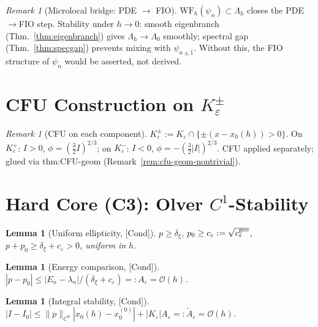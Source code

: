 \documentclass[12pt,a4paper]{amsart}
\newtheorem{lemma}[theorem]{Lemma}
\theoremstyle{definition}
\theoremstyle{remark}
\newtheorem{remark}[theorem]{Remark}
\newcommand{\Cond}{\textup{[Cond]}}
\begin{document}
\begin{remark}[Microlocal bridge: PDE $\to$ FIO]
\label{rem:micro-bridge}
$\mathrm{WF}_h(\psi_n)\subset\Lambda_h$ closes the PDE$\to$FIO step.
Stability under $h\to 0$: smooth eigenbranch (Thm.~\ref{thm:eigenbranch})
gives $\Lambda_h\to\Lambda_0$ smoothly;
spectral gap (Thm.~\ref{thm:specgap}) prevents mixing with $\psi_{n\pm 1}$.
Without this, the FIO structure of $\psi_n$ would be asserted, not derived.
\end{remark}

\section{CFU Construction on $K_\varepsilon^\pm$}
\label{sec:cfu-components}

\begin{remark}[CFU on each component]
\label{rem:cfu-components}
$K_\varepsilon^\pm:=K_\varepsilon\cap\{\pm(x-x_0(h))>0\}$.
On $K_\varepsilon^+$: $I>0$, $\phi=(\tfrac32 I)^{2/3}$;
on $K_\varepsilon^-$: $I<0$, $\phi=-(\tfrac32|I|)^{2/3}$.
CFU \cite{CFU1957} applied separately;
glued via thm:CFU-geom (Remark~\ref{rem:cfu-geom-nontrivial}).
\end{remark}

\section{Hard Core (C3): Olver $C^1$-Stability}
\label{sec:olver-C1}

\begin{lemma}[Uniform ellipticity, \Cond]
\label{lem:uniform-ellipticity}
$p\ge\delta_\xi$, $p_0\ge c_\varepsilon:=\sqrt{c_\varepsilon^{\rm geo}}$,
$p+p_0\ge\delta_\xi+c_\varepsilon>0$, uniform in $h$.
\end{lemma}

\begin{lemma}[Energy comparison, \Cond]
\label{lem:energy-comparison}
$|p-p_0|\le|E_n-\lambda_n|/(\delta_\xi+c_\varepsilon)=:A_\varepsilon=\mathcal{O}(h)$.
\end{lemma}

\begin{lemma}[Integral stability, \Cond]
\label{lem:integral-stability}
$|I-I_0|\le\|p\|_{C^0}|x_0(h)-x_0^{(0)}|+|K_\varepsilon|A_\varepsilon
=:\tilde A_\varepsilon=\mathcal{O}(h)$.
\end{lemma}
\end{document}
